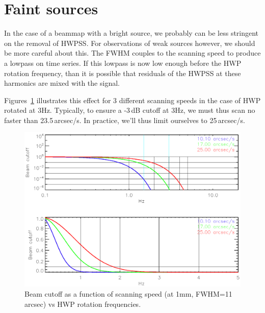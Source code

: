 \documentclass[a4paper,10pt]{article}
\begin{document}
\section{Faint sources}

In the case of a beammap with a bright source, we probably can be less stringent
on the removal of HWPSS. For observations of weak sources however, we should be
more careful about this. The FWHM couples to the scanning speed to produce a
lowpass on time series. If this lowpass is now low enough before the HWP
rotation frequency, than it is possible that residuals of the HWPSS at these
harmonics are mixed with the signal.

Figures~\ref{fig:bhss} illustrates this effect for 3 different scanning speeds
in the case of HWP rotated at 3Hz. Typically, to ensure a -3\,dB cutoff at 3Hz, we must
thus scan no faster than 23.5\,arcsec/s. In practice, we'll thus limit ourselves
to 25\,arcsec/s.

\begin{figure}
\begin{center}
\includegraphics[scale=1,angle=0]{Figures/beam_hwp_scanning_speed.eps}
\caption{Beam cutoff as a function of scanning speed (at 1mm,
  FWHM=11\,arcsec) vs HWP rotation frequencies.}
\label{fig:bhss}
\end{center}
\end{figure}


\begin{thebibliography}{}
\end{thebibliography}
\end{document}
